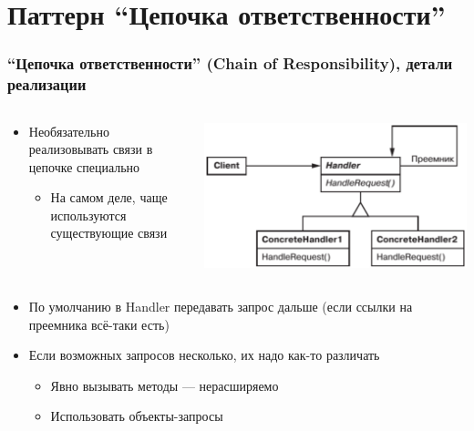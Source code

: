 \documentclass[xetex,mathserif,serif]{beamer}
\begin{document}
	\section{Паттерн ``Цепочка ответственности''}

	\begin{frame}
		\frametitle{``Цепочка ответственности'' (Chain of Responsibility), детали реализации}
		\begin{columns}
			\begin{column}{0.5\textwidth}
				\begin{itemize}
					\item Необязательно реализовывать связи в цепочке специально
					\begin{itemize}
						\item На самом деле, чаще используются существующие связи
					\end{itemize}

				\end{itemize}
			\end{column}
			\begin{column}{0.5\textwidth}
				\begin{center}
					\includegraphics[width=\textwidth]{chainOfResponsibility.png}
				\end{center}
			\end{column}
		\end{columns}
		\begin{itemize}
			\item По умолчанию в Handler передавать запрос дальше (если ссылки на преемника всё-таки есть)
			\item Если возможных запросов несколько, их надо как-то различать
			\begin{itemize}
				\item Явно вызывать методы --- нерасширяемо
				\item Использовать объекты-запросы
			\end{itemize}
		\end{itemize}
	\end{frame}
\end{document}

